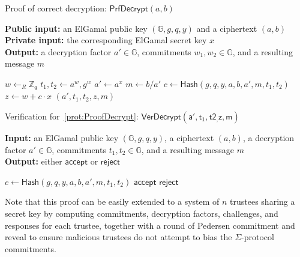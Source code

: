 \documentclass[12pt,a4paper]{article}
\theoremstyle{definition}
\begin{document}
\begin{algorithm}\caption{Proof of correct decryption: $\mathsf{PrfDecrypt}(a, b)$}\label{prot:ProofDecrypt}
    \textbf{Public input:} an ElGamal public key $(\mathbb{G}, g, q, y)$ and a ciphertext $(a, b)$\\
    \textbf{Private input:} the corresponding ElGamal secret key $x$\\
    \textbf{Output:} a decryption factor $a'\in\mathbb{G}$, commitments $w_1, w_2\in\mathbb{G}$, and a resulting message $m$
    \begin{algorithmic}[1]
        \State $w\leftarrow_R\mathbb{Z}_q$
        \State $t_1, t_2 \gets a^w, g^w$
        \State $a' \gets a^x$
        \State $m \gets b/a'$
        \State $c \gets \mathsf{Hash}(g, q, y, a, b, a', m, t_1, t_2)$
        \State $z \gets w+c\cdot x$
        \State \Return $(a', t_1, t_2, z, m)$
    \end{algorithmic}
\end{algorithm}
\begin{algorithm}\caption{Verification for~\ref{prot:ProofDecrypt}: $\mathsf{VerDecrypt(a', t_1, t2_, z, m)}$}\label{prot:VerifyDecrypt}
    \textbf{Input:} an ElGamal public key $(\mathbb{G}, g, q, y)$, a ciphertext $(a, b)$, a decryption factor $a'\in\mathbb{G}$, commitments $t_1, t_2 \in \mathbb{G}$, and a resulting message $m$\\
    \textbf{Output:} either $\mathsf{accept}$ or $\mathsf{reject}$
    \begin{algorithmic}[1]
        \State $c \gets \mathsf{Hash}(g, q, y, a, b, a', m, t_1, t_2)$
            \State \Return $\mathsf{accept}$
        \Else
            \State \Return $\mathsf{reject}$
        \EndIf
    \end{algorithmic}
\end{algorithm}

Note that this proof can be easily extended to a system of $n$ trustees sharing a secret key by computing commitments, decryption factors, challenges, and responses for each trustee, together with a round of Pedersen commitment and reveal to ensure malicious trustees do not attempt to bias the $\Sigma$-protocol commitments.
\end{document}
